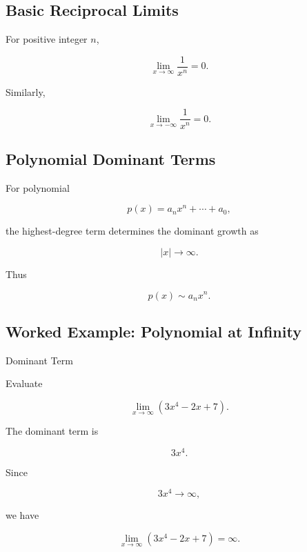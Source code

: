 \subsection{Basic Reciprocal Limits}
\label{subsec:basic-reciprocal-infinity-limits}

For positive integer \(n\),

\[
\boxed{
\lim_{x\to\infty}
\frac{1}{x^n}
=
0.
}
\]

Similarly,

\[
\boxed{
\lim_{x\to-\infty}
\frac{1}{x^n}
=
0.
}
\]

\subsection{Polynomial Dominant Terms}
\label{subsec:polynomial-dominant-term}

For polynomial

\[
p(x)
=
a_nx^n+\cdots+a_0,
\]

the highest-degree term determines the dominant growth as

\[
|x|\to\infty.
\]

Thus

\[
\boxed{
p(x)
\sim
a_nx^n.
}
\]

\subsection{Worked Example: Polynomial at Infinity}
\label{subsec:worked-polynomial-infinity}

\begin{workedexamplebox}{Dominant Term}

Evaluate

\[
\lim_{x\to\infty}
(3x^4-2x+7).
\]

The dominant term is

\[
3x^4.
\]

Since

\[
3x^4\to\infty,
\]

we have

\begin{answerbox}
\[
\boxed{
\lim_{x\to\infty}
(3x^4-2x+7)
=
\infty.
}
\]
\end{answerbox}

\end{workedexamplebox}

